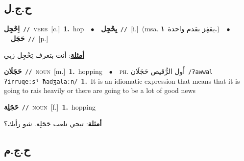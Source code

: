 \documentclass[10pt,a4paper,twoside]{article} %
\begin{document}
\begin{multicols}{2}
{{{{{{{{{{\vspace{-3mm}
\subsection*{\color{blue}\foreignlanguage{arabic}{ح.ج.ل}\color{blue}{}} 

{\setlength\topsep{0pt}\textbf{\foreignlanguage{arabic}{اِحْجِل}}\ {\color{gray}\texttt{//}\color{black}}\ \textsc{verb}\ [c.]\ \textbf{1.}~hop\ \ $\bullet$\ \ \setlength\topsep{0pt}\textbf{\foreignlanguage{arabic}{يِحْجِل}}\ {\color{gray}\texttt{//}\color{black}}\ [i.]\ \color{gray}(msa. \foreignlanguage{arabic}{يقفِز بقدم واحدة}~\foreignlanguage{arabic}{\textbf{١.}})\color{black}\ \ $\bullet$\ \ \setlength\topsep{0pt}\textbf{\foreignlanguage{arabic}{حَجَل}}\ {\color{gray}\texttt{//}\color{black}}\ [p.]\  \begin{flushright}\color{gray}\foreignlanguage{arabic}{\textbf{\underline{\foreignlanguage{arabic}{أمثلة}}}: أنت بتعرف تِحْجِل زيي}\end{flushright}\color{black}} \vspace{2mm}

{\setlength\topsep{0pt}\textbf{\foreignlanguage{arabic}{حَجَلَان}}\ {\color{gray}\texttt{//}\color{black}}\ \textsc{noun}\ [m.]\ \textbf{1.}~hopping\ \ $\bullet$\ \ \textsc{ph.} \color{gray} \foreignlanguage{arabic}{أَول الرُّقيص حَجَلَان}\color{black}\ {\color{gray}\texttt{/{\sffamily ʔawwal ʔirruqeːsˤ ħadʒalaːn}/}\color{black}}\ \textbf{1.}~It is an idiomatic expression that means that it is going to rais heavily or there are going to be a lot of good news\ 

{\setlength\topsep{0pt}\textbf{\foreignlanguage{arabic}{حَجَلِة}}\ {\color{gray}\texttt{//}\color{black}}\ \textsc{noun}\ [f.]\ \textbf{1.}~hopping\  \begin{flushright}\color{gray}\foreignlanguage{arabic}{\textbf{\underline{\foreignlanguage{arabic}{أمثلة}}}: تيجي نلعب حَجَلِة. شو رأيك؟}\end{flushright}\color{black}} \vspace{2mm}

\vspace{-3mm}
\subsection*{\color{blue}\foreignlanguage{arabic}{ح.ج.م}\color{blue}{}} 

}}}}}}}}}}}
\end{multicols}
\end{document}

